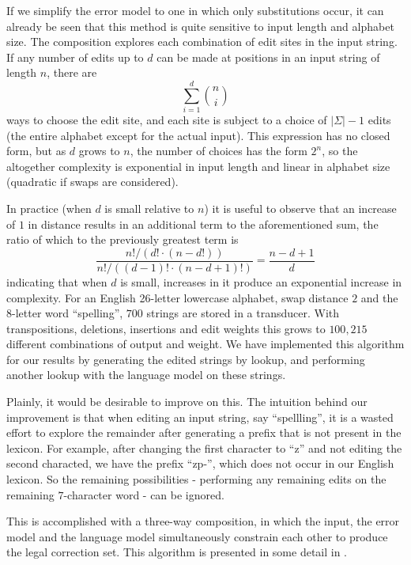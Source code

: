 \documentclass[11pt]{article}
\begin{document}
If we simplify the error model to one in which only substitutions occur, it can
already be seen that this method is quite sensitive to input length and
alphabet size. The composition explores each combination of edit sites in the
input string. If any number of edits up to $d$ can be made at positions in an
input string of length $n$, there are
\begin{displaymath}
\sum_{i=1}^{d} {n \choose i}
\end{displaymath}
ways to choose the edit site, and each site is subject to a choice of
$|\Sigma| - 1$ edits (the
entire alphabet except for the actual input). This expression has no closed
form, but as $d$ grows to $n$, the number of choices has the form $2^n$,
so the altogether complexity is exponential in input length and linear
in alphabet size (quadratic if swaps are considered).

In practice
(when $d$ is small relative to $n$) it is useful to observe that an
increase of $1$ in distance results
in an additional term to the aforementioned sum,
the ratio of which to the previously greatest term is
\begin{displaymath}
\frac{n!/(d!\cdot(n-d!))}{n!/((d-1)!\cdot(n-d+1)!)} = \frac{n-d+1}{d}
\end{displaymath}
indicating that when $d$ is small, increases in it produce an
exponential increase in complexity.
For an English 26-letter lowercase alphabet, swap
distance $2$ and the $8$-letter word ``spelling'', $700$ strings are
stored in a transducer. With transpositions, deletions, insertions and edit
weights this grows to $100,215$ different combinations of output and weight. We
have implemented this algorithm for our results by generating the edited
strings by lookup, and performing another lookup with the language model on
these strings.

Plainly, it would be desirable to improve on this. The intuition behind our
improvement is that when editing an input string, say ``spellling'', it is a
wasted effort to explore the remainder after generating a prefix that is not
present in the lexicon. For example, after changing the first character to ``z''
and not editing the second characted, we have the prefix \mbox{``zp-''}, which does
not occur in our English lexicon. So the remaining possibilities - performing
any remaining edits on the remaining $7$-character word - can be ignored.

This is accomplished with a three-way composition, in which the input, the
error model and the language model simultaneously constrain each other to
produce the legal correction set. This algorithm is presented in some detail
in .
\end{document}
